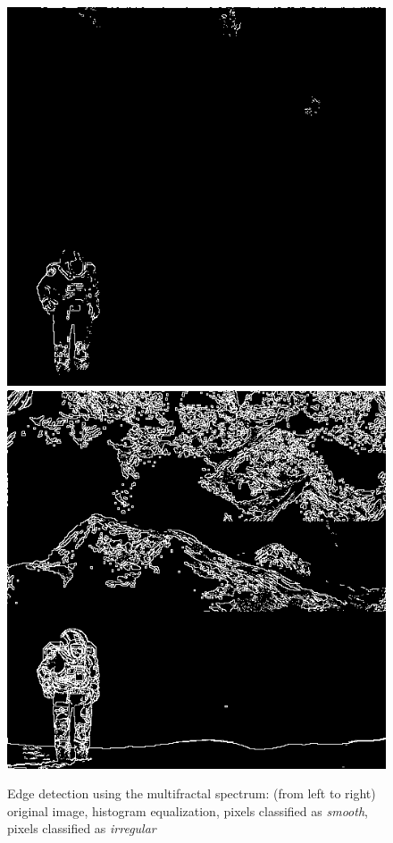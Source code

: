 \documentclass[oneside,a4paper,english,links,12pt]{article}
\begin{document}
\begin{figure}[htb]
\includegraphics[scale=0.25]{imagenes/edgemaxsmooth}
\includegraphics[scale=0.25]{imagenes/edgemaxirreg}
\caption{Edge detection using the multifractal spectrum: (from left to right) original image, histogram equalization, pixels classified as {\em smooth}, pixels classified as {\em irregular}}
\label{fig:camera}
\end{figure}
\end{document}

